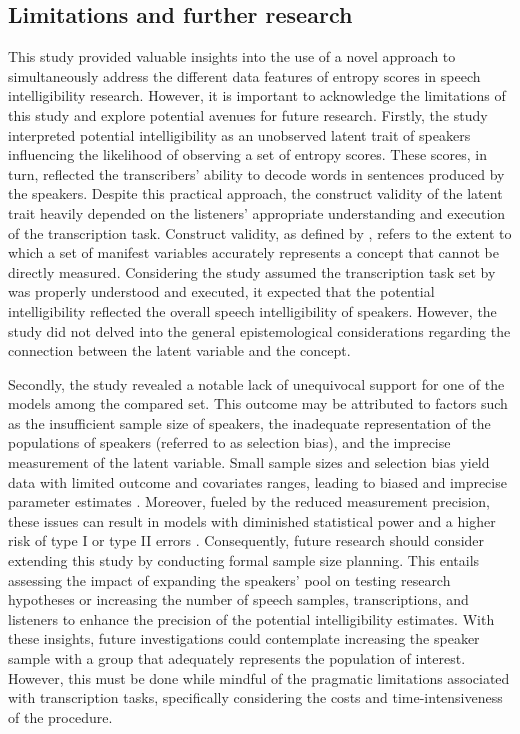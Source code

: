 \documentclass[
  authoryear,
  preprint,
  1p]{elsarticle}
\begin{document}
\subsection{Limitations and further research}\label{sec-D-LFR}

This study provided valuable insights into the use of a novel approach
to simultaneously address the different data features of entropy scores
in speech intelligibility research. However, it is important to
acknowledge the limitations of this study and explore potential avenues
for future research. Firstly, the study interpreted potential
intelligibility as an unobserved latent trait of speakers influencing
the likelihood of observing a set of entropy scores. These scores, in
turn, reflected the transcribers' ability to decode words in sentences
produced by the speakers. Despite this practical approach, the construct
validity of the latent trait heavily depended on the listeners'
appropriate understanding and execution of the transcription task.
Construct validity, as defined by \citet{Cronbach_et_al_1955}, refers to
the extent to which a set of manifest variables accurately represents a
concept that cannot be directly measured. Considering the study assumed
the transcription task set by \citet{Boonen_et_al_2023} was properly
understood and executed, it expected that the potential intelligibility
reflected the overall speech intelligibility of speakers. However, the
study did not delved into the general epistemological considerations
regarding the connection between the latent variable and the concept.

Secondly, the study revealed a notable lack of unequivocal support for
one of the models among the compared set. This outcome may be attributed
to factors such as the insufficient sample size of speakers, the
inadequate representation of the populations of speakers (referred to as
selection bias), and the imprecise measurement of the latent variable.
Small sample sizes and selection bias yield data with limited outcome
and covariates ranges, leading to biased and imprecise parameter
estimates \citep{Everitt_et_al_2010}. Moreover, fueled by the reduced
measurement precision, these issues can result in models with diminished
statistical power and a higher risk of type I or type II errors
\citep{McElreath_2020}. Consequently, future research should consider
extending this study by conducting formal sample size planning. This
entails assessing the impact of expanding the speakers' pool on testing
research hypotheses or increasing the number of speech samples,
transcriptions, and listeners to enhance the precision of the potential
intelligibility estimates. With these insights, future investigations
could contemplate increasing the speaker sample with a group that
adequately represents the population of interest. However, this must be
done while mindful of the pragmatic limitations associated with
transcription tasks, specifically considering the costs and
time-intensiveness of the procedure.
\end{document}
